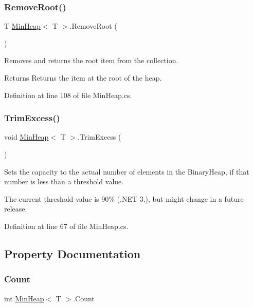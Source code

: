 \subsubsection{\texorpdfstring{Remove\+Root()}{RemoveRoot()}}
{\footnotesize\ttfamily T \hyperlink{class_min_heap}{Min\+Heap}$<$ T $>$.Remove\+Root (\begin{DoxyParamCaption}{ }\end{DoxyParamCaption})}



Removes and returns the root item from the collection. 

\begin{DoxyReturn}{Returns}
Returns the item at the root of the heap.
\end{DoxyReturn}


Definition at line 108 of file Min\+Heap.\+cs.

\mbox{\label{class_min_heap_a95d3f69823be576087b028d2e24300de}} 
\subsubsection{\texorpdfstring{Trim\+Excess()}{TrimExcess()}}
{\footnotesize\ttfamily void \hyperlink{class_min_heap}{Min\+Heap}$<$ T $>$.Trim\+Excess (\begin{DoxyParamCaption}{ }\end{DoxyParamCaption})}



Sets the capacity to the actual number of elements in the Binary\+Heap, if that number is less than a threshold value. 

The current threshold value is 90\% (.N\+ET 3.), but might change in a future release. 

Definition at line 67 of file Min\+Heap.\+cs.



\subsection{Property Documentation}
\mbox{\label{class_min_heap_af0e0aa9be4131a317e7a54c86e5aebc9}} 
\subsubsection{\texorpdfstring{Count}{Count}}
{\footnotesize\ttfamily int \hyperlink{class_min_heap}{Min\+Heap}$<$ T $>$.Count\hspace{0.3cm}{\ttfamily [get]}}




